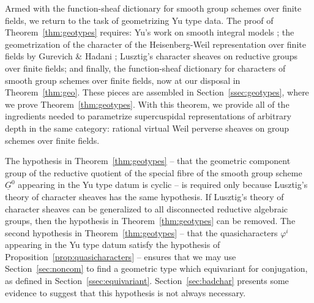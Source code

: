 \documentclass[10pt]{amsart}
\theoremstyle{plain}
\theoremstyle{definition}
\begin{document}
Armed with the function-sheaf dictionary for smooth group schemes over finite fields, we return to the task of geometrizing Yu type data. 
The proof of Theorem~\ref{thm:geotypes} requires: Yu's work on smooth integral models \cite{Yu:models}; the geometrization of the character of the Heisenberg-Weil representation over finite fields by Gurevich \& Hadani \cite{gurevich-hadani:07a}; Lusztig's character sheaves on reductive groups over finite fields; and finally, the function-sheaf dictionary for characters of smooth group schemes over finite fields, now at our disposal in Theorem~\ref{thm:geo}.
These pieces are assembled in Section~\ref{ssec:geotypes}, where we prove Theorem~\ref{thm:geotypes}.
With this theorem, we provide all of the ingredients needed to parametrize supercuspidal representations of arbitrary depth in the same category: rational virtual Weil perverse sheaves on group schemes over finite fields. 
 
The hypothesis in Theorem~\ref{thm:geotypes} -- that the geometric component group of the reductive quotient of the special fibre of the smooth group scheme $\underline{G}^0$ appearing in the Yu type datum is cyclic --  is required only because Lusztig's theory of character sheaves has the same hypothesis.
If Lusztig's theory of character sheaves can be generalized to all disconnected reductive algebraic groups, then the hypothesis in Theorem~\ref{thm:geotypes} can be removed.
%
The second hypothesis  in Theorem~\ref{thm:geotypes} -- that the quasicharacters $\varphi^i$ appearing in the Yu type datum satisfy the hypothesis of Proposition~\ref{prop:quasicharacters} -- ensures that we may use Section~\ref{sec:noncom} to find a geometric type which equivariant for conjugation, as defined in Section~\ref{ssec:equivariant}.
Section~\ref{sec:badchar} presents some evidence to suggest that this hypothesis is not always necessary. 
\bigskip
\end{document}
